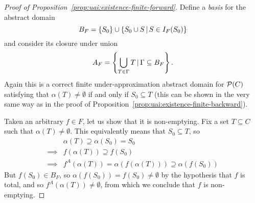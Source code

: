 \begin{proof}[Proof of Proposition~\ref{prop:uai:existence-finite-forward}]
	Define a \textit{basis} for the abstract domain
	\begin{equation*}
		B_F = \{ S_0 \} \cup \{ S_0 \cup S \,\vert\, S \in I_F(S_0) \}
	\end{equation*}
	and consider its closure under union
	\begin{equation*}
		A_F = \left\lbrace \bigcup\limits_{T \in \Gamma} T \,\vert\, \Gamma \subseteq B_F \right\rbrace .
	\end{equation*}
	Again this is a correct finite under-approximation abstract domain for $\mathcal{P}(C)$ satisfying that $\alpha(T) \neq \emptyset$ if and only if $S_0 \subseteq T$ (this can be shown in the very same way as in the proof of Proposition~\ref{prop:uai:existence-finite-backward}).

	Taken an arbitrary $f \in F$, let us show that it is non-emptying. Fix a set $T \subseteq C$ such that $\alpha(T) \neq \emptyset$. This equivalently means that $S_0 \subseteq T$, so
	\begin{align*}
		         & \alpha(T) \supseteq \alpha(S_0) = S_0                            \\
		\implies & f(\alpha(T)) \supseteq f(S_0)                                    \\
		\implies & f^{A}(\alpha(T)) = \alpha(f(\alpha(T))) \supseteq \alpha(f(S_0))
	\end{align*}
	But $f(S_0) \in B_F$, so $\alpha(f(S_0)) = f(S_0) \neq \emptyset$ by the hypothesis that $f$ is total, and so $f^{A}(\alpha(T)) \neq \emptyset$, from which we conclude that $f$ is non-emptying.
\end{proof}

